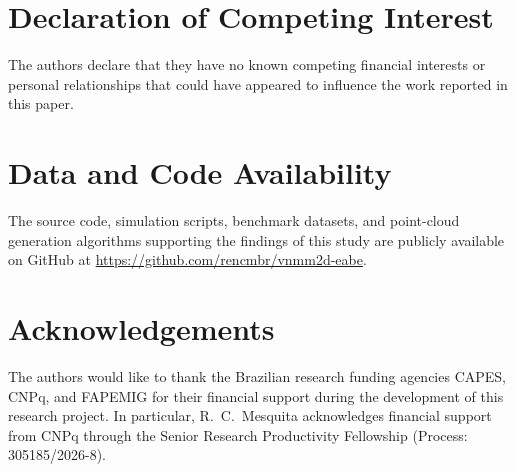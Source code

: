 \documentclass[preprint,12pt]{elsarticle}
\begin{document}
\section*{Declaration of Competing Interest}
The authors declare that they have no known competing financial interests or personal relationships that could have appeared to influence the work reported in this paper.

\section*{Data and Code Availability}
The source code, simulation scripts, benchmark datasets, and point-cloud generation algorithms supporting the findings of this study are publicly available on GitHub at \url{https://github.com/rencmbr/vnmm2d-eabe}.

\section*{Acknowledgements}
The authors would like to thank the Brazilian research funding agencies CAPES, CNPq, and FAPEMIG for their financial support during the development of this research project. In particular, R.~C.~Mesquita acknowledges financial support from CNPq through the Senior Research Productivity Fellowship (Process: 305185/2026-8).



\end{document}
